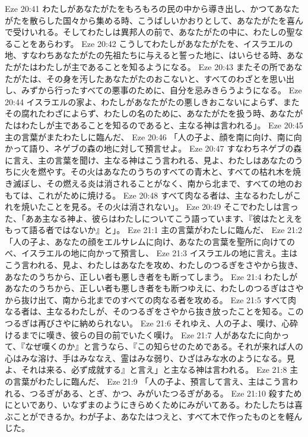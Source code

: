 Eze 20:41  わたしがあなたがたをもろもろの民の中から導き出し、かつてあなたがたを散らした国々から集める時、こうばしいかおりとして、あなたがたを喜んで受けいれる。そしてわたしは異邦人の前で、あなたがたの中に、わたしの聖なることをあらわす。
Eze 20:42  こうしてわたしがあなたがたを、イスラエルの地、すなわちあなたがたの先祖たちに与えると誓った地に、はいらせる時、あなたがたはわたしが主であることを知るようになる。
Eze 20:43  またその所であなたがたは、その身を汚したあなたがたのおこないと、すべてのわざとを思い出し、みずから行ったすべての悪事のために、自分を忌みきらうようになる。
Eze 20:44  イスラエルの家よ、わたしがあなたがたの悪しきおこないによらず、またその腐れたわざによらず、わたしの名のために、あなたがたを扱う時、あなたがたはわたしが主であることを知るのであると、主なる神は言われる」。
Eze 20:45  主の言葉がまたわたしに臨んだ、
Eze 20:46  「人の子よ、顔を南に向け、南に向かって語り、ネゲブの森の地に対して預言せよ。
Eze 20:47  すなわちネゲブの森に言え、主の言葉を聞け、主なる神はこう言われる、見よ、わたしはあなたのうちに火を燃やす。その火はあなたのうちのすべての青木と、すべての枯れ木を焼き滅ぼし、その燃える炎は消されることがなく、南から北まで、すべての地のおもては、これがために焼ける。
Eze 20:48  すべて肉なる者は、主なるわたしがこれを焼いたことを見る。その火は消されない」。
Eze 20:49  そこでわたしは言った、「ああ主なる神よ、彼らはわたしについてこう語っています、『彼はたとえをもって語る者ではないか』と」。
Eze 21:1  主の言葉がわたしに臨んだ、
Eze 21:2  「人の子よ、あなたの顔をエルサレムに向け、あなたの言葉を聖所に向けてのべ、イスラエルの地に向かって預言し、
Eze 21:3  イスラエルの地に言え。主はこう言われる、見よ、わたしはあなたを攻め、わたしのつるぎをさやから抜き、あなたのうちから、正しい者も悪しき者をも断ってしまう。
Eze 21:4  わたしがあなたのうちから、正しい者も悪しき者をも断つゆえに、わたしのつるぎはさやから抜け出て、南から北までのすべての肉なる者を攻める。
Eze 21:5  すべて肉なる者は、主なるわたしが、そのつるぎをさやから抜き放ったことを知る。このつるぎは再びさやに納められない。
Eze 21:6  それゆえ、人の子よ、嘆け、心砕けるまでに嘆き、彼らの目の前でいたく嘆け。
Eze 21:7  人があなたに向かって、『なぜ嘆くのか』と言うなら、『この知らせのためである。それが来れば人の心はみな溶け、手はみななえ、霊はみな弱り、ひざはみな水のようになる。見よ、それは来る、必ず成就する』と言え」と主なる神は言われる。
Eze 21:8  主の言葉がわたしに臨んだ、
Eze 21:9  「人の子よ、預言して言え、主はこう言われる、つるぎがある、とぎ、かつ、みがいたつるぎがある。
Eze 21:10  殺すためにといであり、いなずまのようにきらめくためにみがいてある。わたしたちは喜ぶことができるか。わが子よ、あなたはつえと、すべて木で作ったものとを軽んじた。
